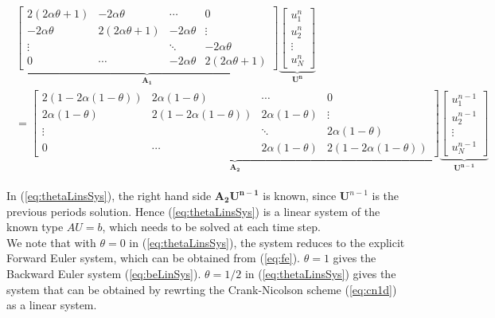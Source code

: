\documentclass{article}
\begin{document}
\begin{subequations}
	\begin{align}
		\begin{split}
		\underbrace{\begin{bmatrix} 2(2 \alpha \theta + 1) & - 2\alpha \theta & \cdots & 0 \\ - 2\alpha \theta & 2(2 \alpha \theta + 1) & - 2\alpha \theta & \vdots \\
			\vdots & &  \ddots & - 2\alpha \theta \\ 
			0 & \cdots & - 2\alpha \theta &2(2 \alpha \theta + 1) \end{bmatrix}}_{\mathbf{A_1}} 
		\underbrace{\begin{bmatrix} u_1^n\\ u_2^n \\ \vdots\\ u_N^n \end{bmatrix}}_{\mathbf{U^{n}}}\\ = 
		\underbrace{\begin{bmatrix} 2( 1 - 2 \alpha (1-\theta)) &  2\alpha (1-\theta) & \cdots & 0 \\  2\alpha (1-\theta) & 2( 1 - 2 \alpha (1-\theta)) &  2\alpha (1-\theta) & \vdots \\
	\vdots & &  \ddots &  2\alpha (1-\theta) \\ 
	0 & \cdots &  2\alpha (1-\theta) &2( 1 - 2 \alpha (1-\theta)) \end{bmatrix}}_{\mathbf{A_2}} 
	\underbrace{\begin{bmatrix} u_1^{n-1}\\ u_2^{n-1} \\ \vdots\\ u_N^{n-1} \end{bmatrix}}_{\mathbf{U^{n-1}}}	
		\end{split}\label{eq:thetaLinsSys}
	\end{align}
\end{subequations}

In (\ref{eq:thetaLinsSys}), the right hand side $\mathbf{A_2 U^{n-1}}$ is known, since $\mathbf{U}^{n-1}$ is the previous periods solution. Hence (\ref{eq:thetaLinsSys}) is a linear system of the known type $A U = b$, which needs to be solved at each time step.\\

We note that with $\theta = 0$ in (\ref{eq:thetaLinsSys}), the system reduces to the explicit Forward Euler system, which can be obtained from (\ref{eq:fe}). $\theta  = 1$ gives the Backward Euler system (\ref{eq:beLinSys}). $\theta = 1/2$ in (\ref{eq:thetaLinsSys}) gives the system that can be obtained by rewrting the Crank-Nicolson scheme (\ref{eq:cn1d}) as a linear system.\\
\end{document}
